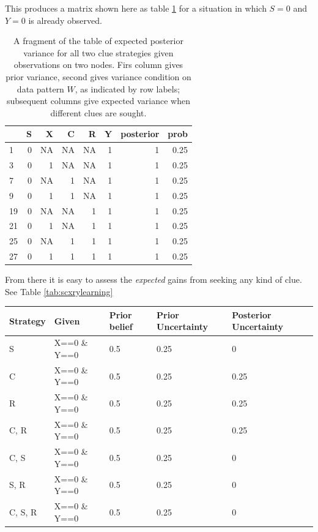 \documentclass[12pt,]{book}
\begin{document}
This produces a matrix shown here as table \ref{tab:showstrats5xx} for a situation in which \(S=0\) and \(Y=0\) is already observed.

\begin{table}[t]

\caption{\label{tab:showstrats5xx}A fragment of the table of expected posterior variance for all two clue strategies given observations on two nodes. Firs column gives prior variance, second gives variance condition on data pattern $W$, as indicated by row labels; subsequent columns give expected variance when different clues are sought. }
\centering
\begin{tabular}{l|r|r|r|r|r|r|r}
\hline
  & S & X & C & R & Y & posterior & prob\\
\hline
1 & 0 & NA & NA & NA & 1 & 1 & 0.25\\
\hline
3 & 0 & 1 & NA & NA & 1 & 1 & 0.25\\
\hline
7 & 0 & NA & 1 & NA & 1 & 1 & 0.25\\
\hline
9 & 0 & 1 & 1 & NA & 1 & 1 & 0.25\\
\hline
19 & 0 & NA & NA & 1 & 1 & 1 & 0.25\\
\hline
21 & 0 & 1 & NA & 1 & 1 & 1 & 0.25\\
\hline
25 & 0 & NA & 1 & 1 & 1 & 1 & 0.25\\
\hline
27 & 0 & 1 & 1 & 1 & 1 & 1 & 0.25\\
\hline
\end{tabular}
\end{table}

From there it is easy to assess the \emph{expected} gains from seeking any kind of clue. See Table \ref{tab:scxrylearning}

\begin{tabular}{l|l|l|l|l}
\hline
Strategy & Given & Prior belief & Prior Uncertainty & Posterior Uncertainty\\
\hline
S & X==0 \& Y==0 & 0.5 & 0.25 & 0\\
\hline
C & X==0 \& Y==0 & 0.5 & 0.25 & 0.25\\
\hline
R & X==0 \& Y==0 & 0.5 & 0.25 & 0.25\\
\hline
C, R & X==0 \& Y==0 & 0.5 & 0.25 & 0.25\\
\hline
C, S & X==0 \& Y==0 & 0.5 & 0.25 & 0\\
\hline
S, R & X==0 \& Y==0 & 0.5 & 0.25 & 0\\
\hline
C, S, R & X==0 \& Y==0 & 0.5 & 0.25 & 0\\
\hline
\end{tabular}
\end{document}
